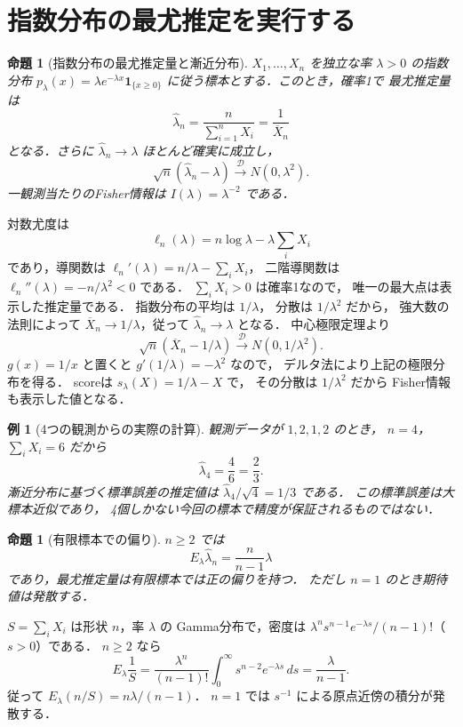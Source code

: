 \documentclass[a5paper,10pt,onecolumn]{jsarticle}
\makeatletter
\theoremstyle{mathnotetheorem}
\newtheorem{proposition}[theorem]{命題}
\newtheorem{example}[theorem]{例}
\renewcommand{\proofname}{証明}
\renewenvironment{proof}[1][\proofname]{%
  \par\pushQED{\qed}\normalfont\topsep4\p@\@plus2\p@\relax
  \trivlist\item[\hskip\labelsep\bfseries #1]\ignorespaces
}{\popQED\endtrivlist\@endpefalse}
\makeatother
\begin{document}
\section{指数分布の最尤推定を実行する}
\begin{proposition}[指数分布の最尤推定量と漸近分布]\label{prop:exp-mle}
$X_1,\ldots,X_n$ を独立な率 $\lambda>0$ の指数分布
$p_\lambda(x)=\lambda e^{-\lambda x}\mathbf1_{\{x\ge0\}}$
に従う標本とする．このとき，確率1で
最尤推定量は
\[
 \widehat\lambda_n=\frac n{\sum_{i=1}^nX_i}
                    =\frac1{\overline X_n}
\]
となる．さらに $\widehat\lambda_n\to\lambda$
ほとんど確実に成立し，
\[
 \sqrt n(\widehat\lambda_n-\lambda)
 \xrightarrow{\mathcal D}N(0,\lambda^2).
\]
一観測当たりのFisher情報は $I(\lambda)=\lambda^{-2}$ である．
\end{proposition}
\begin{proof}
対数尤度は
\[
 \ell_n(\lambda)
 =n\log\lambda-\lambda\sum_iX_i
\]
であり，導関数は
$\ell_n'(\lambda)=n/\lambda-\sum_iX_i$，
二階導関数は
$\ell_n''(\lambda)=-n/\lambda^2<0$ である．
$\sum_iX_i>0$ は確率1なので，
唯一の最大点は表示した推定量である．
指数分布の平均は $1/\lambda$，
分散は $1/\lambda^2$ だから，
強大数の法則によって
$\overline X_n\to1/\lambda$，従って
$\widehat\lambda_n\to\lambda$ となる．
中心極限定理より
\[
 \sqrt n(\overline X_n-1/\lambda)
 \xrightarrow{\mathcal D}N(0,1/\lambda^2).
\]
$g(x)=1/x$ と置くと $g'(1/\lambda)=-\lambda^2$ なので，
デルタ法により上記の極限分布を得る．
scoreは $s_\lambda(X)=1/\lambda-X$ で，
その分散は $1/\lambda^2$ だから
Fisher情報も表示した値となる．
\end{proof}
\begin{example}[4つの観測からの実際の計算]\label{ex:exp-data}
観測データが $1,2,1,2$ のとき，
$n=4$，$\sum_iX_i=6$ だから
\[
 \widehat\lambda_4=\frac46=\frac23.
\]
漸近分布に基づく標準誤差の推定値は
$\widehat\lambda_4/\sqrt4=1/3$ である．
この標準誤差は大標本近似であり，
4個しかない今回の標本で精度が保証されるものではない．
\end{example}
\begin{proposition}[有限標本での偏り]\label{prop:exp-bias}
$n\ge2$ では
\[
 E_\lambda\widehat\lambda_n=\frac n{n-1}\lambda
\]
であり，最尤推定量は有限標本では正の偏りを持つ．
ただし $n=1$ のとき期待値は発散する．
\end{proposition}
\begin{proof}
$S=\sum_iX_i$ は形状 $n$，率 $\lambda$ の
Gamma分布で，密度は
$\lambda^ns^{n-1}e^{-\lambda s}/(n-1)!$（$s>0$）である．
$n\ge2$ なら
\[
 E_\lambda\frac1S
 =\frac{\lambda^n}{(n-1)!}
   \int_0^\infty s^{n-2}e^{-\lambda s}\,ds
 =\frac{\lambda}{n-1}.
\]
従って $E_\lambda(n/S)=n\lambda/(n-1)$．
$n=1$ では $s^{-1}$ による原点近傍の積分が発散する．
\end{proof}
\end{document}
